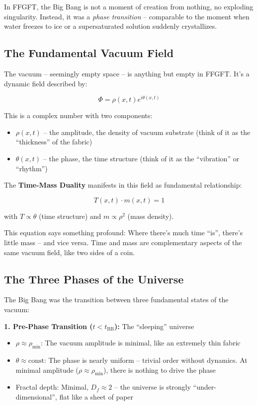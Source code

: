 In FFGFT, the Big Bang is not a moment of creation from nothing, no exploding singularity. Instead, it was a \textit{phase transition} -- comparable to the moment when water freezes to ice or a supersaturated solution suddenly crystallizes.

\subsection{The Fundamental Vacuum Field}

The vacuum -- seemingly empty space -- is anything but empty in FFGFT. It's a dynamic field described by:

\begin{equation}
\Phi = \rho(x,t) e^{i\theta(x,t)}
\end{equation}

This is a complex number with two components:
\begin{itemize}[leftmargin=*]
\item $\rho(x,t)$ -- the amplitude, the density of vacuum substrate (think of it as the ``thickness'' of the fabric)
\item $\theta(x,t)$ -- the phase, the time structure (think of it as the ``vibration'' or ``rhythm'')
\end{itemize}

The \textbf{Time-Mass Duality} manifests in this field as fundamental relationship:

\begin{equation}
T(x,t) \cdot m(x,t) = 1
\end{equation}

with $T \propto \theta$ (time structure) and $m \propto \rho^2$ (mass density).

This equation says something profound: Where there's much time ``is'', there's little mass -- and vice versa. Time and mass are complementary aspects of the same vacuum field, like two sides of a coin.

\subsection{The Three Phases of the Universe}

The Big Bang was the transition between three fundamental states of the vacuum:

\textbf{1. Pre-Phase Transition ($t < t_{\text{BB}}$):} The ``sleeping'' universe

\begin{itemize}[leftmargin=*]
\item $\rho \approx \rho_{\min}$: The vacuum amplitude is minimal, like an extremely thin fabric
\item $\theta \approx \text{const}$: The phase is nearly uniform -- trivial order without dynamics. At minimal amplitude ($\rho \approx \rho_{\min}$), there is nothing to drive the phase
\item Fractal depth: Minimal, $D_f \approx 2$ -- the universe is strongly ``under-dimensional'', flat like a sheet of paper
\end{itemize}

